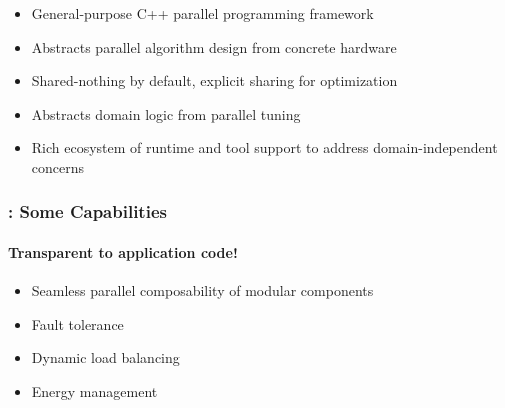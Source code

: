 \begin{frame}
\frametitle{\charm}
\framesubtitle{}
    \begin{itemize}
        \item General-purpose C++ parallel programming framework
        \item Abstracts parallel algorithm design from concrete hardware
        \item Shared-nothing by default, explicit sharing for optimization
        \item Abstracts domain logic from parallel tuning
        \item Rich ecosystem of runtime and tool support to address domain-independent
          concerns
    \end{itemize}
\end{frame}


\begin{frame}
\frametitle{\charm: Some Capabilities}
\framesubtitle{Transparent to application code!}
    \begin{itemize}
        \item Seamless parallel composability of modular components
        \item Fault tolerance
        \item Dynamic load balancing
        \item Energy management
    \end{itemize}
\end{frame}


